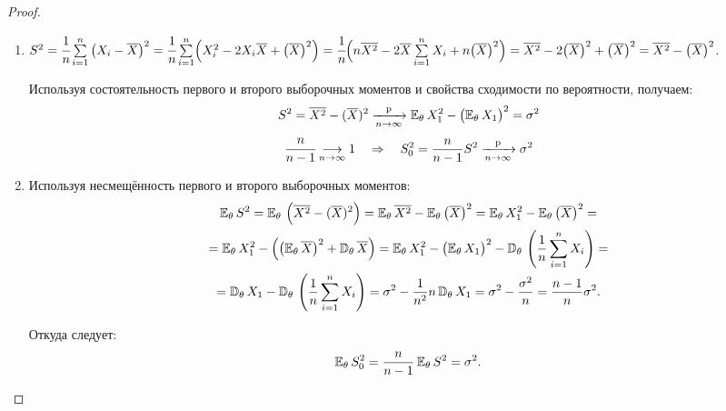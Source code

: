 \begin{proof}
\begin{enumerate}
    \item 
    $S^{2} = 
    \cfrac{1}{n} \sum\limits_{i=1}^{n}\left(X_{i}-\overline{X}\right)^{2} = 
    \cfrac{1}{n} \sum\limits_{i=1}^{n}\Bigl(X_i^2 - 2 X_i \overline{X} + \bigl(\overline{X}\bigr)^2 \Bigr) = \\
    \cfrac{1}{n} \Bigl( n \overline{X^2} - 2 \overline{X} \sum\limits_{i=1}^{n}X_i + n \bigl(\overline{X}\bigr)^2\Bigr) = 
    \overline{X^{2}}-2\bigl(\overline{X}\bigr)^{2} + \bigl(\overline{X}\bigr)^2 = 
    \overline{X^{2}}-\bigl(\overline{X}\bigr)^{2}$.

    Используя состоятельность первого и второго выборочных моментов и свойства сходимости по вероятности, получаем:
    \begin{gather*}
        S^{2}=\overline{X^{2}}-(\overline{X})^{2} \xrightarrow[n \to \infty]{\text{p}} \mathbb{E}_{\theta}\,  X_{1}^{2} - \bigl(\mathbb{E}_{\theta}\,  X_{1}\bigr)^{2}=\sigma^{2} \\
        \cfrac{n}{n-1} \underset{n \to \infty}{\longrightarrow} 1 \quad \Rightarrow \quad S_{0}^{2}=\frac{n}{n-1} S^{2} \xrightarrow[n \to \infty]{\text{p}} \sigma^{2}
    \end{gather*}
    
    \item Используя несмещённость первого и второго выборочных моментов:
    \begin{multline*}
        \mathbb{E}_{\theta}\,  S^{2} = \mathbb{E}_{\theta}\, \left(\overline{X^{2}}-(\overline{X})^{2}\right)
        = \mathbb{E}_{\theta}\, \overline{X^{2}}-\mathbb{E}_{\theta}\, \bigl(\overline{X}\bigr)^{2}
        = \mathbb{E}_{\theta}\, X_{1}^{2}-\mathbb{E}_{\theta}\, \bigl(\overline{X}\bigr)^{2} = \\
        = \mathbb{E}_{\theta}\, X_{1}^{2}-\Bigl(\bigl(\mathbb{E}_{\theta}\, \overline{X}\bigr)^{2} + \mathbb{D}_{\theta}\, \overline{X}\Bigr)
        = \mathbb{E}_{\theta}\, X_{1}^{2}-\bigl(\mathbb{E}_{\theta}\, X_{1}\bigr)^{2} - \mathbb{D}_{\theta}\, \left(\frac{1}{n} \sum\limits_{i=1}^{n} X_{i}\right) = \\
        = \mathbb{D}_{\theta}\, X_1 - \mathbb{D}_{\theta}\, \left(\frac{1}{n} \sum\limits_{i=1}^{n} X_{i}\right)
        = \sigma^{2}-\frac{1}{n^{2}} n \, \mathbb{D}_{\theta}\,  X_{1}
        = \sigma^{2}-\frac{\sigma^{2}}{n}
        = \frac{n-1}{n} \sigma^{2}.
    \end{multline*}
    
    Откуда следует:
    \begin{equation*}
        \mathbb{E}_{\theta}\, S_{0}^{2}=\frac{n}{n-1} \, \mathbb{E}_{\theta}\, S^{2}=\sigma^{2}.
    \end{equation*}
    

\end{enumerate}
\end{proof}
